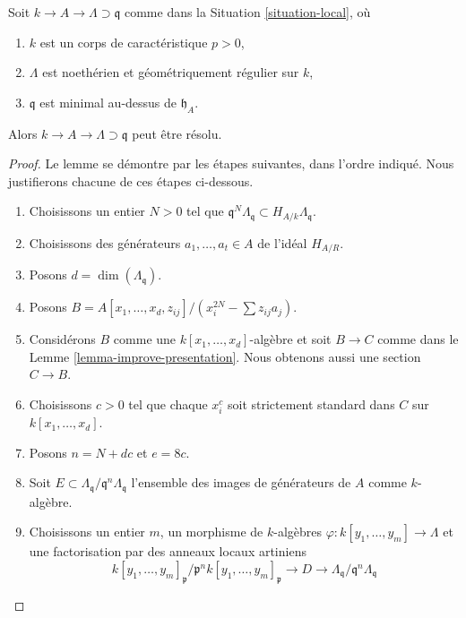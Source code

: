 \begin{lemma}
\label{lemma-resolve-general}
Soit $k \to A \to \Lambda \supset \mathfrak q$ comme dans la
Situation \ref{situation-local}, où
\begin{enumerate}
\item $k$ est un corps de caractéristique $p > 0$,
\item $\Lambda$ est noethérien et géométriquement régulier sur $k$,
\item $\mathfrak q$ est minimal au-dessus de $\mathfrak h_A$.
\end{enumerate}
Alors $k \to A \to \Lambda \supset \mathfrak q$ peut être résolu.
\end{lemma}

\begin{proof}
Le lemme se démontre par les étapes suivantes, dans l'ordre indiqué.
Nous justifierons chacune de ces étapes ci-dessous.
\begin{enumerate}
\item
\label{item-power}
Choisissons un entier $N > 0$ tel que
$\mathfrak q^N\Lambda_\mathfrak q \subset H_{A/k}\Lambda_\mathfrak q$.
\item
\label{item-generators}
Choisissons des générateurs $a_1, \ldots, a_t \in A$ de l'idéal $H_{A/R}$.
\item
\label{item-dimension}
Posons $d = \dim(\Lambda_\mathfrak q)$.
\item
\label{item-standardizer}
Posons $B = A[x_1, \ldots, x_d, z_{ij}]/(x_i^{2N} - \sum z_{ij}a_j)$.
\item
\label{item-elkik}
Considérons $B$ comme une $k[x_1, \ldots, x_d]$-algèbre et soit
$B \to C$ comme dans le
Lemme \ref{lemma-improve-presentation}.
Nous obtenons aussi une section $C \to B$.
\item
\label{item-strictly-standard}
Choisissons $c > 0$ tel que chaque $x_i^c$
soit strictement standard dans $C$ sur $k[x_1, \ldots, x_d]$.
\item
\label{item-set-n}
Posons $n = N + dc$ et $e = 8c$.
\item
\label{item-set-E}
Soit $E \subset \Lambda_\mathfrak q/\mathfrak q^n\Lambda_\mathfrak q$
l'ensemble des images de générateurs de $A$ comme $k$-algèbre.
\item
\label{item-NP}
Choisissons un entier $m$, un morphisme de $k$-algèbres
$\varphi : k[y_1, \ldots, y_m] \to \Lambda$
et une factorisation par des anneaux locaux artiniens
$$
k[y_1, \ldots, y_m]_\mathfrak p/\mathfrak p^n k[y_1, \ldots, y_m]_\mathfrak p
\to D \to
\Lambda_\mathfrak q/\mathfrak q^n\Lambda_\mathfrak q
$$
\end{enumerate}
\end{proof}
